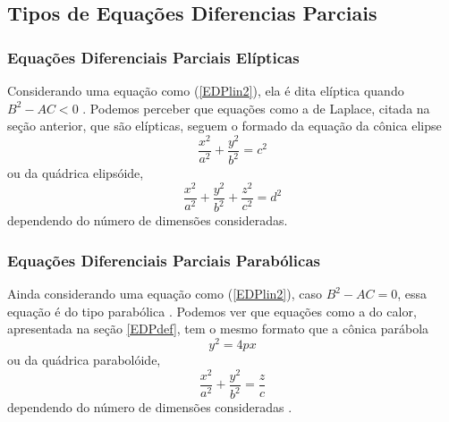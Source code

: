             \subsection{Tipos de Equações Diferencias Parciais}
        
                \subsubsection{Equações Diferenciais Parciais Elípticas}
                
                    Considerando uma equação como (\ref{EDPlin2}), ela é dita elíptica quando $B^2 - AC < 0$ \cite{wiki:EDP}. Podemos perceber que equações como a de Laplace, citada na seção anterior, que são elípticas, seguem o formado da equação da cônica elipse
                    \begin{equation*}
                        \frac{x^2}{a^2} + \frac{y^2}{b^2} = c^2
                    \end{equation*}
                    ou da quádrica elipsóide,
                    \begin{equation*}
                        \frac{x^2}{a^2} + \frac{y^2}{b^2} + \frac{z^2}{c^2}= d^2
                    \end{equation*}
                    dependendo do número de dimensões consideradas.
                
                \subsubsection{Equações Diferenciais Parciais Parabólicas}
                
                    Ainda considerando uma equação como (\ref{EDPlin2}), caso $B^2 - AC = 0$, essa equação é do tipo parabólica \cite{wiki:EDP}. Podemos ver que equações como a do calor, apresentada na seção \ref{EDPdef}, tem o mesmo formato que a cônica parábola \cite{wiki:parabola}
                    \begin{equation*}
                        y^2 = 4px
                    \end{equation*}
                    ou da quádrica parabolóide,
                    \begin{equation*}
                        \frac{x^2}{a^2} + \frac{y^2}{b^2} = \frac{z}{c}
                    \end{equation*}
                    dependendo do número de dimensões consideradas \cite{wiki:paraboloide}.
                
